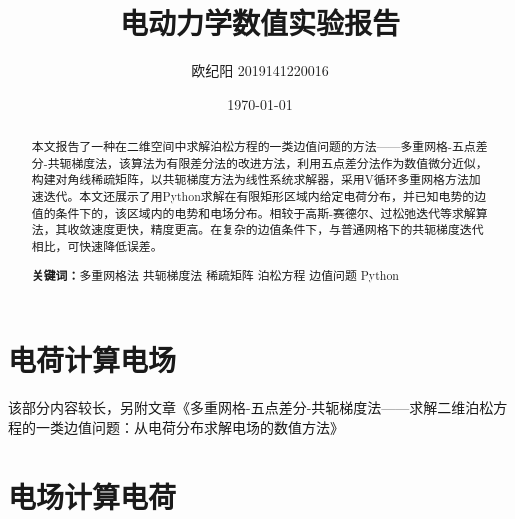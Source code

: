 \documentclass{article} %
\title{电动力学数值实验报告} %
\author{欧纪阳 2019141220016} %
\date{\today} %
\begin{document}
\maketitle %
\begin{abstract} %
    \quad 本文报告了一种在二维空间中求解泊松方程的一类边值问题的方法——多重网格-五点差分-共轭梯度法，该算法为有限差分法的改进方法，利用五点差分法作为数值微分近似，构建对角线稀疏矩阵，以共轭梯度方法为线性系统求解器，采用V循环多重网格方法加速迭代。本文还展示了用Python求解在有限矩形区域内给定电荷分布，并已知电势的边值的条件下的，该区域内的电势和电场分布。相较于高斯-赛德尔、过松弛迭代等求解算法，其收敛速度更快，精度更高。在复杂的边值条件下，与普通网格下的共轭梯度迭代相比，可快速降低误差。

    \textbf{关键词：}多重网格法 \quad 共轭梯度法 \quad 稀疏矩阵 \quad 泊松方程 \quad 边值问题 \quad Python
\end{abstract}

\tableofcontents %
\thispagestyle{empty} %

\newpage

\part{电荷计算电场}
该部分内容较长，另附文章《多重网格-五点差分-共轭梯度法——求解二维泊松方程的一类边值问题：从电荷分布求解电场的数值方法》

\part{电场计算电荷}
\end{document}
